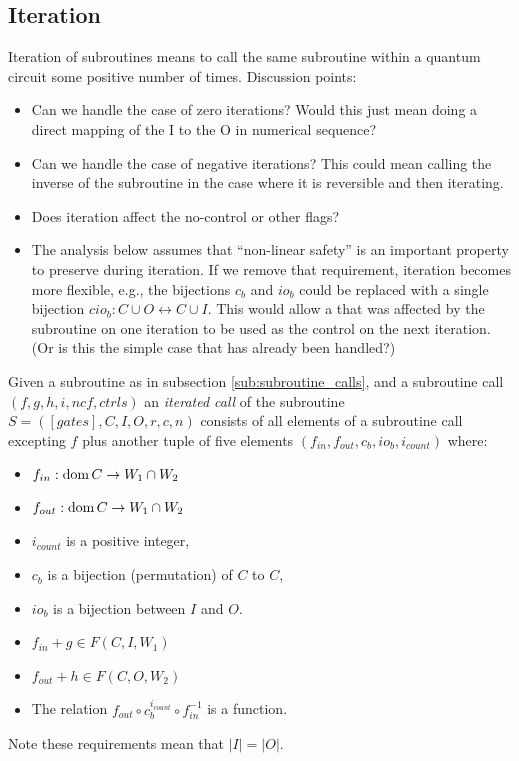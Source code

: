\subsection{Iteration} %
\label{sub:iteration}
Iteration of subroutines means to call the same subroutine
within a quantum circuit some positive number of times.
Discussion points:
\begin{itemize}
  \item Can we handle the case of zero iterations? Would this
  just mean doing a direct mapping of the I to the O
  in numerical sequence?
  \item Can we handle the case of negative iterations? This could
  mean calling the inverse of the subroutine in the case
  where it is reversible and then iterating.
  \item Does iteration affect the no-control or other flags?
  \item The analysis below assumes that ``non-linear safety'' is
  an important property to preserve during iteration.
  If we remove that requirement, iteration becomes more flexible,
  e.g., the bijections $c_b$ and $io_b$ could be
  replaced with a single bijection $cio_b : C\cup O \leftrightarrow C\cup I$.
  This would allow a \qubit that was
  affected by the subroutine on one iteration to be used as the
  control on the next iteration. (Or is this the simple
  case that has already been handled?)
\end{itemize}
\begin{definition}\label{def:iterated_subroutine_call}
  Given a subroutine as in subsection \vref{sub:subroutine_calls},
  and a subroutine call $(f,g,h,i,ncf,ctrls)$
  an \emph{iterated call} of the subroutine
  $S = ([gates],C,I,O,r,c,n)$ consists of all elements of a
  subroutine call excepting $f$ plus another
  tuple of five elements $(f_{in},f_{out},c_b,io_b,i_{count})$
  where:
  \begin{itemize}
    \item $f_{in}:\operatorname*{dom} C \to W_1\cap W_2$
    \item $f_{out}:\operatorname*{dom} C \to W_1\cap W_2$
    \item $i_{count}$ is a positive integer,
    \item $c_b$ is a bijection (permutation) of $C$ to $C$,
    \item $io_b$ is a bijection between $I$ and $O$.
    \item $f_{in}+ g \in F(C,I,W_1)$
    \item $f_{out}+ h \in F(C,O,W_2)$
    \item The relation $f_{out} \circ c_b^{i_{count}} \circ f_{in}^{-1}$
    is a function.
  \end{itemize}
  Note these requirements mean that $|I| = |O|$.
\end{definition}

